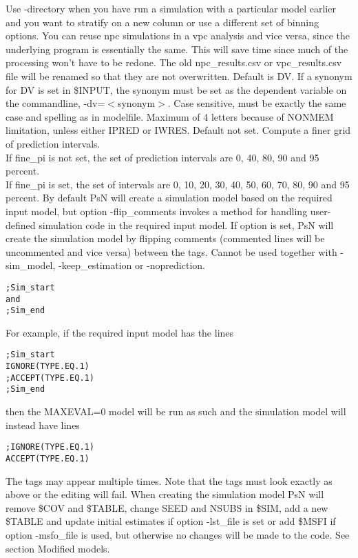 \begin{optionlist}
\nextopt
{}
Use -directory when you have run a simulation with a particular model earlier and you want to stratify on a new column or use a different set of binning options. You can reuse npc simulations in a vpc analysis and vice versa, since the underlying program is essentially the same. This will save time since much of the processing won't have to be redone. The old npc\_results.csv or vpc\_results.csv file will be renamed so that they are not overwritten.
\nextopt
{}
Default is DV. If a synonym for DV is set in \mbox{\$INPUT}, the synonym must be set as the dependent variable on the commandline, -dv=$<$synonym$>$. 
Case sensitive, must be exactly the same case and spelling as in modelfile. Maximum of 4 letters because of NONMEM limitation, unless either IPRED or IWRES.
\nextopt
{}
Default not set. Compute a finer grid of prediction intervals.\\ If fine\_pi is not set, the set of prediction intervals are 0, 40, 80, 90 and 95 percent.\\ 
If fine\_pi is set, the set of intervals are 0, 10, 20, 30, 40, 50, 60, 70, 80, 90 and 95 percent.
\nextopt
{}
By default PsN will create a simulation model based on the  required input model, but option -flip\_comments invokes a method for handling user-defined simulation code in the required input model. If option is set, PsN will create the simulation model by flipping comments (commented lines will be uncommented and vice versa) between the tags.
Cannot be used together with -sim\_model, -keep\_estimation or -noprediction.
\begin{verbatim}
;Sim_start
and 
;Sim_end
\end{verbatim}
For example, if the required input model has the lines
\begin{verbatim}
;Sim_start 
IGNORE(TYPE.EQ.1)
;ACCEPT(TYPE.EQ.1) 
;Sim_end
\end{verbatim}
then the MAXEVAL=0 model will be run as such and the simulation model will instead have lines
\begin{verbatim}
;IGNORE(TYPE.EQ.1)
ACCEPT(TYPE.EQ.1) 
\end{verbatim}
The tags may appear multiple times. Note that the tags must look exactly  as above or the editing will fail. When creating the simulation model PsN will remove \$COV and \$TABLE, change SEED and NSUBS in \$SIM, add a new \$TABLE and  update initial estimates if option -lst\_file is set or add \$MSFI if option -msfo\_file is used, but otherwise no changes will be made to the code. See section Modified models.\\

\end{optionlist}
